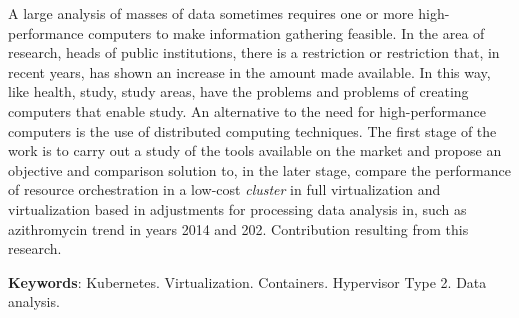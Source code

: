 
\begin{resumo}[Abstract]
    A large analysis of masses of data sometimes requires one or more high-performance computers to make information gathering feasible. In the area of research, heads of public institutions, there is a restriction or restriction that, in recent years, has shown an increase in the amount made available. In this way, like health, study, study areas, have the problems and problems of creating computers that enable study. An alternative to the need for high-performance computers is the use of distributed computing techniques. The first stage of the work is to carry out a study of the tools available on the market and propose an objective and comparison solution to, in the later stage, compare the performance of resource orchestration in a low-cost \emph{cluster} in full virtualization and virtualization based in adjustments for processing data analysis in, such as azithromycin trend in years 2014 and 202. Contribution resulting from this research.

    \textbf{Keywords}: Kubernetes. Virtualization. Containers. Hypervisor Type 2. Data analysis.
\end{resumo}

